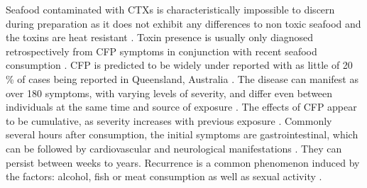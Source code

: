 \documentclass[12pt]{article}
\begin{document}
Seafood contaminated with CTXs is characteristically impossible to discern during preparation as it does not exhibit any differences to non toxic seafood and the toxins are heat resistant \cite{withers1982ciguatera}. Toxin presence is usually only diagnosed retrospectively from CFP symptoms in conjunction with recent seafood consumption \cite{sims1987theoretical}. CFP is predicted to be widely under reported with as little of 20 \% of cases being reported  in Queensland, Australia \cite{lewis2006ciguatera}. The disease can manifest as over 180 symptoms, with varying levels of severity, and differ even between individuals at the same time and source of exposure \cite{sims1987theoretical}. The effects of CFP appear to be cumulative, as severity increases with previous exposure \cite{emerson1983preliminary}. Commonly several hours after consumption, the initial symptoms are gastrointestinal, which can be followed by cardiovascular and neurological manifestations \cite{sims1987theoretical}. They can persist between weeks to years. Recurrence is a common phenomenon induced by the factors: alcohol, fish or meat consumption \cite{lewis2006ciguatera} as well as sexual activity \cite{lange1992travel}. \\
\end{document}
